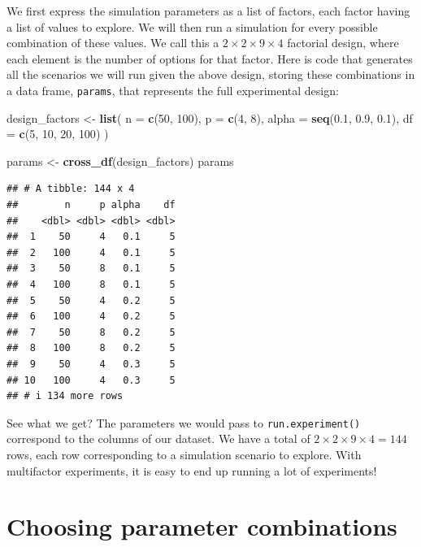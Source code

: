 \documentclass[
]{book}
\newenvironment{Shaded}{\begin{snugshade}}{\end{snugshade}}
\newcommand{\AttributeTok}[1]{\textcolor[rgb]{0.13,0.29,0.53}{#1}}
\newcommand{\DecValTok}[1]{\textcolor[rgb]{0.00,0.00,0.81}{#1}}
\newcommand{\FloatTok}[1]{\textcolor[rgb]{0.00,0.00,0.81}{#1}}
\newcommand{\FunctionTok}[1]{\textcolor[rgb]{0.13,0.29,0.53}{\textbf{#1}}}
\newcommand{\NormalTok}[1]{#1}
\newcommand{\OtherTok}[1]{\textcolor[rgb]{0.56,0.35,0.01}{#1}}
\begin{document}
We first express the simulation parameters as a list of factors, each factor having a list of values to explore.
We will then run a simulation for every possible combination of these values.
We call this a \(2 \times 2 \times 9 \times 4\) factorial design, where each element is the number of options for that factor.
Here is code that generates all the scenarios we will run given the above design, storing these combinations in a data frame, \texttt{params}, that represents the full experimental design:

\begin{Shaded}
\begin{Highlighting}[]
\NormalTok{design\_factors }\OtherTok{\textless{}{-}} \FunctionTok{list}\NormalTok{(}
  \AttributeTok{n =} \FunctionTok{c}\NormalTok{(}\DecValTok{50}\NormalTok{, }\DecValTok{100}\NormalTok{),}
  \AttributeTok{p =} \FunctionTok{c}\NormalTok{(}\DecValTok{4}\NormalTok{, }\DecValTok{8}\NormalTok{),}
  \AttributeTok{alpha =} \FunctionTok{seq}\NormalTok{(}\FloatTok{0.1}\NormalTok{, }\FloatTok{0.9}\NormalTok{, }\FloatTok{0.1}\NormalTok{),}
  \AttributeTok{df =} \FunctionTok{c}\NormalTok{(}\DecValTok{5}\NormalTok{, }\DecValTok{10}\NormalTok{, }\DecValTok{20}\NormalTok{, }\DecValTok{100}\NormalTok{)}
\NormalTok{)}

\NormalTok{params }\OtherTok{\textless{}{-}} \FunctionTok{cross\_df}\NormalTok{(design\_factors)}
\NormalTok{params}
\end{Highlighting}
\end{Shaded}

\begin{verbatim}
## # A tibble: 144 x 4
##        n     p alpha    df
##    <dbl> <dbl> <dbl> <dbl>
##  1    50     4   0.1     5
##  2   100     4   0.1     5
##  3    50     8   0.1     5
##  4   100     8   0.1     5
##  5    50     4   0.2     5
##  6   100     4   0.2     5
##  7    50     8   0.2     5
##  8   100     8   0.2     5
##  9    50     4   0.3     5
## 10   100     4   0.3     5
## # i 134 more rows
\end{verbatim}

See what we get?
The parameters we would pass to \texttt{run.experiment()} correspond to the
columns of our dataset.
We have a total of \(2 \times 2 \times 9 \times 4 = 144\) rows, each row corresponding to a simulation scenario to explore.
With multifactor experiments, it is easy to end up running a lot of experiments!

\section{Choosing parameter combinations}\label{choosing-parameter-combinations}
\end{document}
